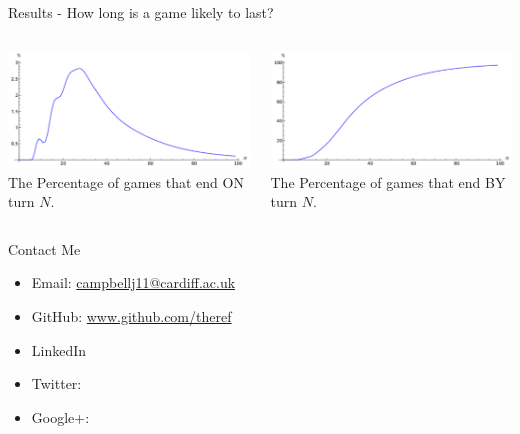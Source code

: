 \documentclass{beamer}
\begin{document}
\begin{frame}{Results - How long is a game likely to last?}
  \begin{columns}
      \begin{center}
      \includegraphics[width=\linewidth]{images/turns}\\
      The Percentage of games that end ON turn $N$.
      \end{center}
      \begin{center}
      \includegraphics[width=\linewidth]{images/sumturns}\\
      The Percentage of games that end BY turn $N$.
      \end{center}
  \end{columns}
\end{frame}

\begin{frame}{Contact Me}
  \begin{itemize}
    \itemsep2em
    \item Email: \href{mailto:campbellj11@cardiff.ac.uk}{campbellj11@cardiff.ac.uk}

    \item GitHub: \href{https://github.com/theref}{www.github.com/theref}

    \item LinkedIn

    \item Twitter: 

    \item Google+: 
  \end{itemize}
\end{frame}
\end{document}
